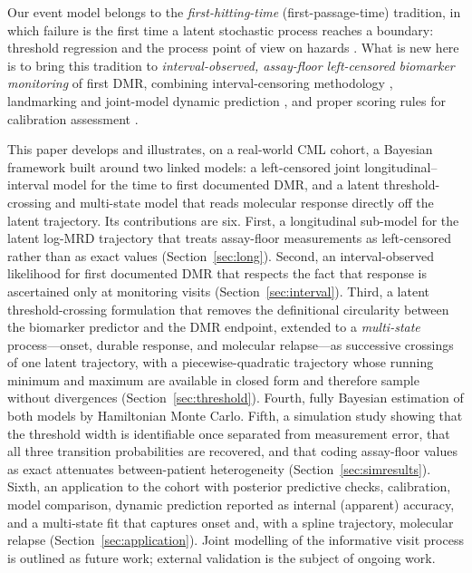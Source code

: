 \documentclass[11pt]{article}
\begin{document}
Our event model belongs to the \emph{first-hitting-time} (first-passage-time)
tradition, in which failure is the first time a latent stochastic process
reaches a boundary: threshold regression \cite{LeeWhitmore2006ThresholdRegression}
and the process point of view on hazards
\cite{AalenGjessing2001ProcessView,AalenBorganGjessing2008}. What is new here is
to bring this tradition to \emph{interval-observed, assay-floor left-censored
biomarker monitoring} of first DMR, combining interval-censoring methodology
\cite{Sun2006IntervalCensored}, landmarking and joint-model dynamic prediction
\cite{vanHouwelingen2007Landmarking,Rizopoulos2011DynamicPredictions}, and proper
scoring rules for calibration assessment \cite{GneitingRaftery2007ProperScoring}.

This paper develops and illustrates, on a real-world CML cohort, a Bayesian
framework built around two linked models: a left-censored joint
longitudinal--interval model for the time to first documented DMR, and a latent
threshold-crossing and multi-state model that reads molecular response directly
off the latent trajectory. Its contributions are six. First, a longitudinal
sub-model for the latent log-MRD trajectory that treats assay-floor
measurements as left-censored rather than as exact values
(Section~\ref{sec:long}). Second, an interval-observed likelihood for first
documented DMR that respects the fact that response is ascertained only at
monitoring visits (Section~\ref{sec:interval}). Third, a latent
threshold-crossing formulation that removes the definitional circularity
between the biomarker predictor and the DMR endpoint, extended to a
\emph{multi-state} process---onset, durable response, and molecular
relapse---as successive crossings of one latent trajectory, with a
piecewise-quadratic trajectory whose running minimum and maximum are available
in closed form and therefore sample without divergences
(Section~\ref{sec:threshold}). Fourth, fully Bayesian estimation of both models
by Hamiltonian Monte Carlo. Fifth, a simulation study showing that the
threshold width is identifiable once separated from measurement error, that all
three transition probabilities are recovered, and that coding assay-floor
values as exact attenuates between-patient heterogeneity
(Section~\ref{sec:simresults}). Sixth, an application to the cohort with
posterior predictive checks, calibration, model comparison, dynamic prediction
reported as internal (apparent) accuracy, and a multi-state fit that captures
onset and, with a spline trajectory, molecular relapse
(Section~\ref{sec:application}). Joint modelling of the informative visit
process is outlined as future work; external validation is the subject of
ongoing work.
\end{document}
